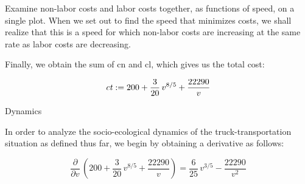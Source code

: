 \documentclass{article}
\begin{document}
\begin{maplegroup}
\begin{mapleinput}
\end{mapleinput}

\end{maplegroup}
\begin{maplegroup}
Examine non-labor costs and labor costs together, as functions of
speed, on a single plot. When we set out to find the speed that
minimizes costs, we shall realize that this is a speed for which
non-labor costs are increasing at the same rate as labor costs are
decreasing.

\begin{mapleinput}
\end{mapleinput}

\end{maplegroup}
\begin{maplegroup}
Finally, we obtain the sum of cn and cl, which gives us the total
cost:

\begin{mapleinput}
\end{mapleinput}

\mapleresult
\begin{maplelatex}
\[
{\it ct} := 200 + {\displaystyle \frac {3}{20}} \,v^{8/5} +
{\displaystyle \frac {22290}{v}}
\]
\end{maplelatex}

\end{maplegroup}
\begin{maplegroup}
\begin{mapleinput}
\end{mapleinput}

\end{maplegroup}
\begin{maplegroup}
\begin{Heading 3}
Dynamics
\end{Heading 3}

In order to analyze the socio-ecological dynamics of the
truck-transportation situation as defined thus far, we begin by
obtaining a derivative as follows:

\begin{mapleinput}
\end{mapleinput}

\mapleresult
\begin{maplelatex}
\[
{\frac {\partial }{\partial v}}\,(200 + {\displaystyle \frac {3}{
20}} \,v^{8/5} + {\displaystyle \frac {22290}{v}} )=
{\displaystyle \frac {6}{25}} \,v^{3/5} - {\displaystyle \frac {
22290}{v^{2}}}
\]
\end{maplelatex}

\end{maplegroup}
\end{document}
